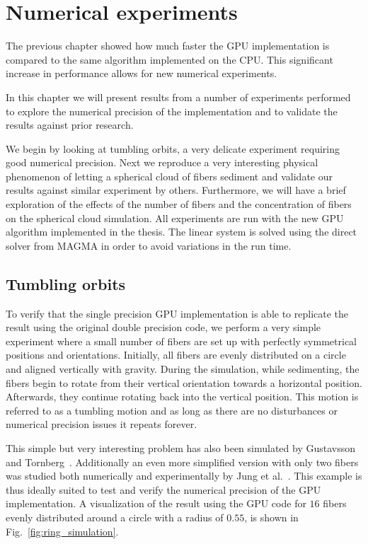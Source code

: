 \chapter{Numerical experiments}
\label{cha:experiments}

The previous chapter showed how much faster the GPU implementation is compared to the same algorithm implemented on the CPU. This significant increase in performance allows for new numerical experiments.

In this chapter we will present results from a number of experiments performed to explore the numerical precision of the implementation and to validate the results against prior research. 

We begin by looking at tumbling orbits, a very delicate experiment requiring good numerical precision. Next we reproduce a very interesting physical phenomenon of letting a spherical cloud of fibers sediment and validate our results against similar experiment by others. Furthermore, we will have a brief exploration of the effects of the number of fibers and the concentration of fibers on the spherical cloud simulation. All experiments are run with the new GPU algorithm  implemented in the thesis. The linear system is solved using the direct solver from MAGMA in order to avoid variations in the run time.

\section{Tumbling orbits}
\label{sec:example_ring}

To verify that the single precision GPU implementation is able to replicate the result using the original double precision code, we perform a very simple experiment where a small number of fibers are set up with perfectly symmetrical positions and orientations. Initially, all fibers are evenly distributed on a circle and aligned vertically with gravity. During the simulation, while sedimenting, the fibers begin to rotate from their vertical orientation towards a horizontal position. Afterwards, they continue rotating back into the vertical position. This motion is referred to as a tumbling motion and as long as there are no disturbances or numerical precision issues it repeats forever.

This simple but very interesting problem has also been simulated by Gustavsson and Tornberg~\cite{Gustavsson2009}. Additionally an even more simplified version with only two fibers was studied both numerically and experimentally by Jung et al.~\cite{Jung2006}. This example is thus ideally suited to test and verify the numerical precision of the GPU implementation. A visualization of the result using the GPU code for $16$ fibers evenly distributed around a circle with a radius of $0.55$, is shown in Fig.~\ref{fig:ring_simulation}.

